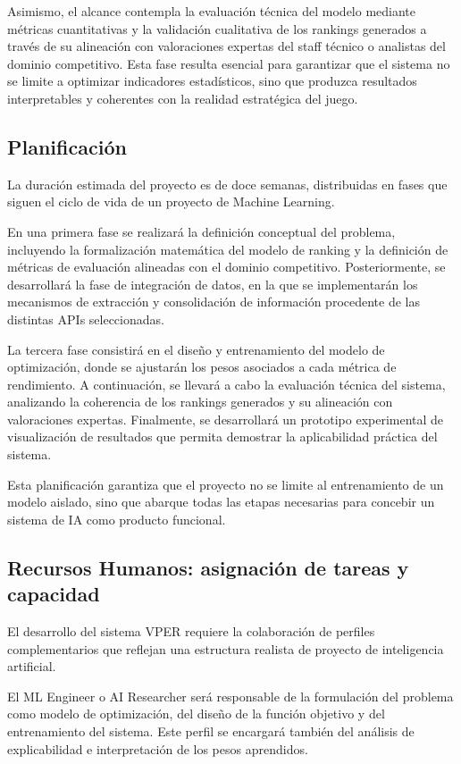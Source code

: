 \documentclass{ULBreport} %
\begin{document}
Asimismo, el alcance contempla la evaluación técnica del modelo mediante métricas cuantitativas y la validación cualitativa de los rankings generados a través de su alineación con valoraciones expertas del staff técnico o analistas del dominio competitivo. Esta fase resulta esencial para garantizar que el sistema no se limite a optimizar indicadores estadísticos, sino que produzca resultados interpretables y coherentes con la realidad estratégica del juego.

\subsection{Planificación}

La duración estimada del proyecto es de doce semanas, distribuidas en fases que siguen el ciclo de vida de un proyecto de Machine Learning.

En una primera fase se realizará la definición conceptual del problema, incluyendo la formalización matemática del modelo de ranking y la definición de métricas de evaluación alineadas con el dominio competitivo. Posteriormente, se desarrollará la fase de integración de datos, en la que se implementarán los mecanismos de extracción y consolidación de información procedente de las distintas APIs seleccionadas.

La tercera fase consistirá en el diseño y entrenamiento del modelo de optimización, donde se ajustarán los pesos asociados a cada métrica de rendimiento. A continuación, se llevará a cabo la evaluación técnica del sistema, analizando la coherencia de los rankings generados y su alineación con valoraciones expertas. Finalmente, se desarrollará un prototipo experimental de visualización de resultados que permita demostrar la aplicabilidad práctica del sistema.

Esta planificación garantiza que el proyecto no se limite al entrenamiento de un modelo aislado, sino que abarque todas las etapas necesarias para concebir un sistema de IA como producto funcional.

\subsection{Recursos Humanos: asignación de tareas y capacidad}

El desarrollo del sistema VPER requiere la colaboración de perfiles complementarios que reflejan una estructura realista de proyecto de inteligencia artificial.

El ML Engineer o AI Researcher será responsable de la formulación del problema como modelo de optimización, del diseño de la función objetivo y del entrenamiento del sistema. Este perfil se encargará también del análisis de explicabilidad e interpretación de los pesos aprendidos.
\end{document}
